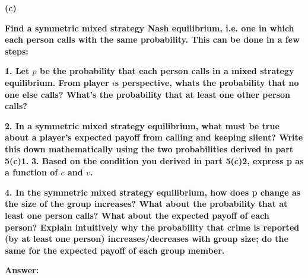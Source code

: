 \documentclass[letterpaper,11pt]{article}
\begin{document}
\begin{addmargin}[-1.1em]{0em}
\textbf{(c)}\par\end{addmargin}
\textbf{Find a symmetric mixed strategy Nash equilibrium, i.e. one in which each person calls with the same probability. This can be done in a few steps:}\par
\bigbreak
\textbf{1. Let $p$ be the probability that each person calls in a mixed strategy equilibrium. From player $i$\’s perspective, what\’s the probability that no one else calls? What’s the probability that at least one other person calls?}\par
\bigbreak
\textbf{2. In a symmetric mixed strategy equilibrium, what must be true about a player’s expected payoff from calling and keeping silent? Write this down mathematically using the two probabilities derived in part 5(c)1.}
\bigbreak
\textbf{3. Based on the condition you derived in part 5(c)2, express p as a function of $c$ and $v$.}\par
\bigbreak
\textbf{4. In the symmetric mixed strategy equilibrium, how does p change as the size of the group increases? What about the probability that at least one person calls? What about the expected payoff of each person? Explain intuitively why the probability that crime is reported (by at least one person) increases/decreases with group size; do the same for the expected payoff of each group member.}


\begin{addmargin}[-0.5em]{0em}
\textbf{Answer: }\end{addmargin}
\end{document}
